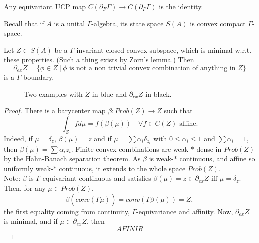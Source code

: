 \begin{cor}\label{Unicity}
Any equivariant UCP map $ C(\partial_F \Gamma)\rightarrow C(\partial_F \Gamma)$ is the identity.
\end{cor}

Recall that if $A$ is a unital $\Gamma$-algebra, its state space $S(A)$ is convex compact $\Gamma$-space.

\begin{prop}[Gleason] \label{Gleason}
Let $Z \subset S(A)$ be a $\Gamma$-invariant closed convex subspace, which is minimal w.r.t. these properties. (Such a thing exists by Zorn's lemma.) Then
\[\partial_{ex}Z = \{ \phi \in Z \ | \ \phi \text{ is not a non trivial convex combination of anything in } Z\}\]
is a $\Gamma$-boundary.
\end{prop}
 
\begin{figure}[ht]
\centering
{}
\caption{Two examples with $Z$ in blue and $\partial_{ex}Z $ in black.}
\end{figure}

\begin{proof}
There is a barycenter map $\beta : Prob(Z) \rightarrow Z$ such that 
\[\int_Z f d\mu = f(\beta(\mu)) \quad \forall f\in C(Z) \text{ affine}.\]
Indeed, if $\mu = \delta_z$, $\beta(\mu) = z$ and if $\mu = \sum \alpha_i \delta_{z_i}$ with $0\leq \alpha_i \leq 1$ and $\sum \alpha_i =1$, then $\beta(\mu) = \sum \alpha_i z_i$. Finite convex combinations are weak-$*$ dense in $Prob(Z)$ by the Hahn-Banach separation theorem. As $\beta$ is weak-$*$ continuous, and affine so uniformly weak-$*$ continuous, it extends to the whole space $Prob(Z)$.\\

Note: $\beta$ is $\Gamma$-equivariant continuous and satisfies $\beta(\mu)=z\in \partial_{ex} Z$ iff $\mu = \delta_z$.\\

Then, for any $\mu \in Prob(Z)$,
\[\beta(\overline{conv(\Gamma\mu)}) = \overline{conv (\Gamma \beta(\mu))}= Z,\]
the first equality coming from continuity, $\Gamma$-equivariance and affinity. Now, $\partial_{ex} Z$ is minimal, and if $\mu \in \partial_{ex} Z$, then 
\[A FINIR\]
\end{proof}

